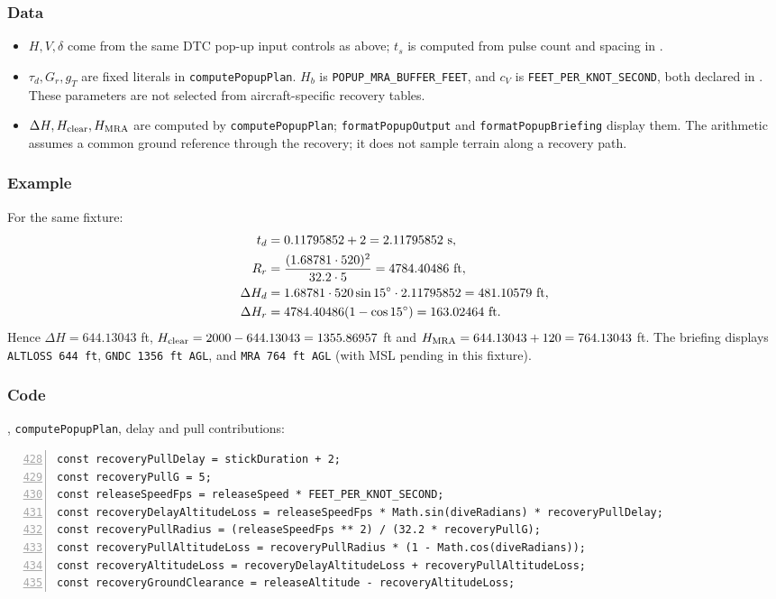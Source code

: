 \documentclass[10pt,a4paper]{amsart}
\begin{document}
\subsubsection*{Data}
\begin{itemize}
\setlength{\itemsep}{0pt}
\setlength{\parsep}{0pt}
\item $H,V,\delta$ come from the same DTC pop-up input controls
as above; $t_s$ is computed from pulse count and spacing in
.
\item $\tau_d,G_r,g_T$ are fixed literals in \texttt{computePopupPlan}.
$H_b$ is \texttt{POPUP\_MRA\_BUFFER\_FEET}, and $c_V$ is
\texttt{FEET\_PER\_KNOT\_SECOND}, both declared in
. These parameters are not selected
from aircraft-specific recovery tables.
\item $\Delta H,H_{\rm clear},H_{\rm MRA}$ are computed by
\texttt{computePopupPlan}; \texttt{formatPopupOutput} and
\texttt{formatPopupBriefing} display them.
The arithmetic assumes a common ground reference through the recovery;
it does not sample terrain along a recovery path.
\end{itemize}

\subsubsection*{Example}
For the same  fixture:
\begin{align*}
 t_d&=0.11795852+2=2.11795852\ {\rm s},\\
 R_r&=\frac{(1.68781\cdot520)^2}{32.2\cdot5}=4784.40486\ {\rm ft},\\
 \Delta H_d&=1.68781\cdot520\sin15^\circ\cdot2.11795852
              =481.10579\ {\rm ft},\\
 \Delta H_r&=4784.40486(1-\cos15^\circ)=163.02464\ {\rm ft}.
\end{align*}
Hence $\Delta H=644.13043$ ft,
$H_{\rm clear}=2000-644.13043=1355.86957$ ft and
$H_{\rm MRA}=644.13043+120=764.13043$ ft.
The briefing displays \texttt{ALTLOSS 644 ft},
\texttt{GNDC 1356 ft AGL}, and \texttt{MRA 764 ft AGL}
(with MSL pending in this fixture).

\subsubsection*{Code}
, \texttt{computePopupPlan}, delay and
pull contributions:
\begin{lstlisting}[numbers=left,firstnumber=428,numberstyle=\tiny,xleftmargin=2em]
const recoveryPullDelay = stickDuration + 2;
const recoveryPullG = 5;
const releaseSpeedFps = releaseSpeed * FEET_PER_KNOT_SECOND;
const recoveryDelayAltitudeLoss = releaseSpeedFps * Math.sin(diveRadians) * recoveryPullDelay;
const recoveryPullRadius = (releaseSpeedFps ** 2) / (32.2 * recoveryPullG);
const recoveryPullAltitudeLoss = recoveryPullRadius * (1 - Math.cos(diveRadians));
const recoveryAltitudeLoss = recoveryDelayAltitudeLoss + recoveryPullAltitudeLoss;
const recoveryGroundClearance = releaseAltitude - recoveryAltitudeLoss;
\end{lstlisting}
\end{document}
